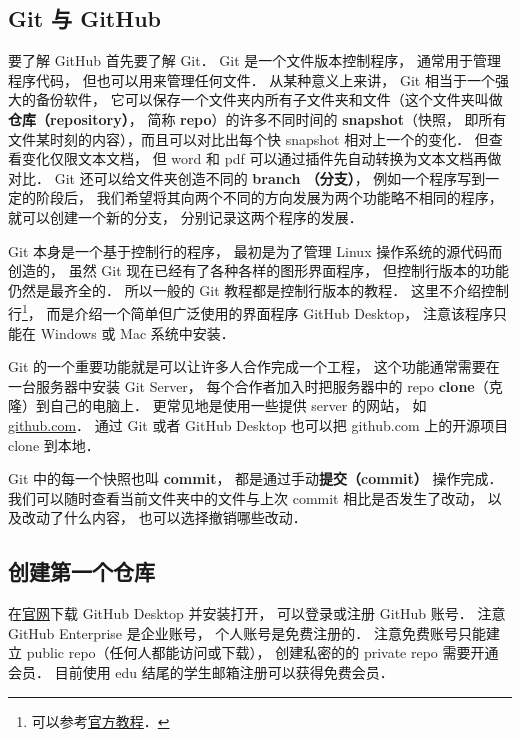 

\begin{issues}
\issueTODO
\end{issues}

\subsection{Git 与 GitHub}
要了解 GitHub 首先要了解 Git． Git 是一个文件版本控制程序， 通常用于管理程序代码， 但也可以用来管理任何文件． 从某种意义上来讲， Git 相当于一个强大的备份软件， 它可以保存一个文件夹内所有子文件夹和文件（这个文件夹叫做 \textbf{仓库（repository）}， 简称 \textbf{repo}）的许多不同时间的 \textbf{snapshot}（快照， 即所有文件某时刻的内容），而且可以对比出每个快 snapshot 相对上一个的变化． 但查看变化仅限文本文档， 但 word 和 pdf 可以通过插件先自动转换为文本文档再做对比． Git 还可以给文件夹创造不同的 \textbf{branch （分支）}， 例如一个程序写到一定的阶段后， 我们希望将其向两个不同的方向发展为两个功能略不相同的程序，就可以创建一个新的分支， 分别记录这两个程序的发展．

Git 本身是一个基于控制行的程序， 最初是为了管理 Linux 操作系统的源代码而创造的， 虽然 Git 现在已经有了各种各样的图形界面程序， 但控制行版本的功能仍然是最齐全的． 所以一般的 Git 教程都是控制行版本的教程． 这里不介绍控制行\footnote{可以参考\href{https://git-scm.com/book/en/v2}{官方教程}．}， 而是介绍一个简单但广泛使用的界面程序 GitHub Desktop， 注意该程序只能在 Windows 或 Mac 系统中安装．

Git 的一个重要功能就是可以让许多人合作完成一个工程， 这个功能通常需要在一台服务器中安装 Git Server， 每个合作者加入时把服务器中的 repo \textbf{clone}（克隆）到自己的电脑上． 更常见地是使用一些提供 server 的网站， 如 \href{https://github.com}{github.com}． 通过 Git 或者 GitHub Desktop 也可以把 github.com 上的开源项目 clone 到本地．

Git 中的每一个快照也叫 \textbf{commit}， 都是通过手动\textbf{提交（commit）} 操作完成． 我们可以随时查看当前文件夹中的文件与上次 commit 相比是否发生了改动， 以及改动了什么内容， 也可以选择撤销哪些改动．
 
\subsection{创建第一个仓库}
在\href{https://desktop.github.com/}{官网}下载 GitHub Desktop 并安装打开， 可以登录或注册 GitHub 账号． 注意 GitHub Enterprise 是企业账号， 个人账号是免费注册的． 注意免费账号只能建立 public repo（任何人都能访问或下载）， 创建私密的的 private repo 需要开通会员． 目前使用 edu 结尾的学生邮箱注册可以获得免费会员．

